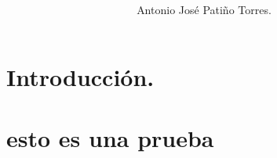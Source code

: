 \documentclass[a4paper, apacite, 12pt, man]{apa6}
\title{ }
\author{Antonio José Patiño Torres.}
\affiliation{Universidad Tecnológica de Bolívar.}
\begin{document}
\maketitle

\section{Introducción.}
 
\section{esto es una prueba}


 
\end{document}

